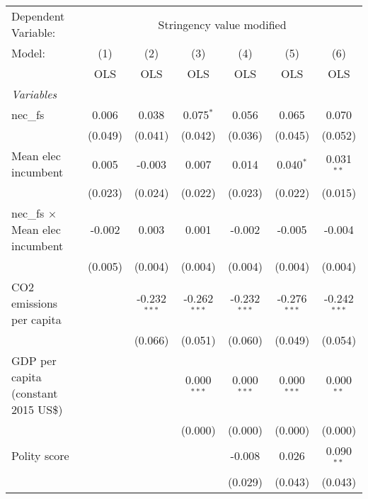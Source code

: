 
\begingroup
\centering
\begin{tabular}{lcccccc}
   \toprule
   Dependent Variable: & \multicolumn{6}{c}{Stringency value modified}\\
   Model:                                 & (1)     & (2)            & (3)            & (4)            & (5)            & (6)\\  
                                          &  OLS    & OLS            & OLS            & OLS            & OLS            & OLS\\  
   \midrule
   \emph{Variables}\\
   nec\_fs                                & 0.006   & 0.038          & 0.075$^{*}$    & 0.056          & 0.065          & 0.070\\   
                                          & (0.049) & (0.041)        & (0.042)        & (0.036)        & (0.045)        & (0.052)\\   
   Mean elec incumbent                    & 0.005   & -0.003         & 0.007          & 0.014          & 0.040$^{*}$    & 0.031$^{**}$\\   
                                          & (0.023) & (0.024)        & (0.022)        & (0.023)        & (0.022)        & (0.015)\\   
   nec\_fs $\times$ Mean elec incumbent   & -0.002  & 0.003          & 0.001          & -0.002         & -0.005         & -0.004\\   
                                          & (0.005) & (0.004)        & (0.004)        & (0.004)        & (0.004)        & (0.004)\\   
   CO2 emissions per capita               &         & -0.232$^{***}$ & -0.262$^{***}$ & -0.232$^{***}$ & -0.276$^{***}$ & -0.242$^{***}$\\   
                                          &         & (0.066)        & (0.051)        & (0.060)        & (0.049)        & (0.054)\\   
   GDP per capita (constant 2015 US\$)    &         &                & 0.000$^{***}$  & 0.000$^{***}$  & 0.000$^{***}$  & 0.000$^{**}$\\   
                                          &         &                & (0.000)        & (0.000)        & (0.000)        & (0.000)\\   
   Polity score                           &         &                &                & -0.008         & 0.026          & 0.090$^{**}$\\   
                                          &         &                &                & (0.029)        & (0.043)        & (0.043)\\   

\end{tabular}
